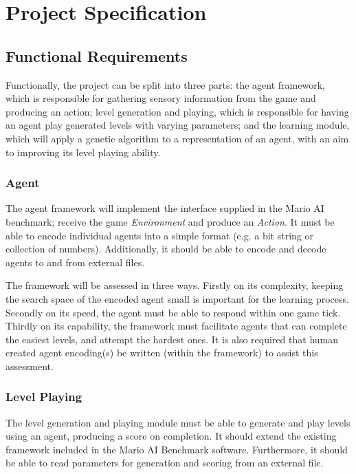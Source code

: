 
\section{Project Specification}
\label{sec:projspec}

\subsection{Functional Requirements}
Functionally, the project can be split into three parts: the agent framework, which is responsible for gathering sensory information from the game and producing an action; level generation and playing, which is responsible for having an agent play generated levels with varying parameters; and the learning module, which will apply a genetic algorithm to a representation of an agent, with an aim to improving its level playing ability. 

\subsubsection{Agent}
The agent framework will implement the interface supplied in the Mario AI benchmark; receive the game \emph{Environment} and produce an \emph{Action}. It must be able to encode individual agents into a simple format (e.g. a bit string or collection of numbers). Additionally, it should be able to encode and decode agents to and from external files. 

The framework will be assessed in three ways. Firstly on its complexity, keeping the search space of the encoded agent small is important for the learning process. Secondly on its speed, the agent must be able to respond within one game tick. Thirdly on its capability, the framework must facilitate agents that can complete the easiest levels, and attempt the hardest ones. It is also required that human created agent encoding(s) be written (within the framework) to assist this assessment.

\subsubsection{Level Playing}
The level generation and playing module must be able to generate and play levels using an agent, producing a score on completion. It should extend the existing framework included in the Mario AI Benchmark software. Furthermore, it should be able to read parameters for generation and scoring from an external file.

